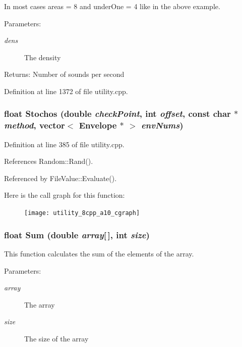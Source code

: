 In most cases areas = 8 and under\-One = 4 like in the above example. \begin{Desc}
\item[Parameters:]
\begin{description}
\item[{\em dens}]The density \end{description}
\end{Desc}
\begin{Desc}
\item[Returns:]Number of sounds per second \end{Desc}


Definition at line 1372 of file utility.cpp.
\subsubsection{\setlength{\rightskip}{0pt plus 5cm}float Stochos (double {\em check\-Point}, int {\em offset}, const char $\ast$ {\em method}, vector$<$ Envelope $\ast$ $>$ {\em env\-Nums})}\label{utility_8cpp_a10}




Definition at line 385 of file utility.cpp.

References Random::Rand().

Referenced by File\-Value::Evaluate().

Here is the call graph for this function:\begin{figure}[H]
\begin{center}
\leavevmode
\texttt{[image: utility\_8cpp\_a10\_cgraph]}
\end{center}
\end{figure}
\subsubsection{\setlength{\rightskip}{0pt plus 5cm}float Sum (double {\em array}[$\,$], int {\em size})}\label{utility_8cpp_a31}


This function calculates the sum of the elements of the array. \begin{Desc}
\item[Parameters:]
\begin{description}
\item[{\em array}]The array \item[{\em size}]The size of the array \end{description}
\end{Desc}


